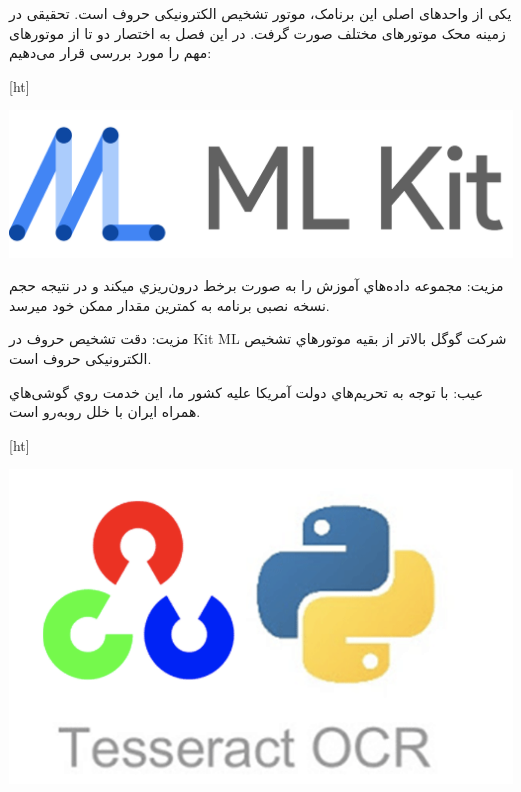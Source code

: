 


یکی از واحدهای اصلی این برنامک، موتور تشخیص الکترونیکی حروف است. تحقیقی در زمینه محک موتورهای مختلف صورت گرفت. در این فصل به اختصار دو تا از موتورهای مهم را مورد بررسی قرار می‌دهیم:




[ht]
\begin{center}
\includegraphics[scale=0.15]{front/template/images/ml-kit.png}
\end{center}


مزیت: مجموعه داده‌هاي آموزش را به صورت برخط درون‌ریزي میکند و در نتیجه
حجم نسخه نصبی برنامه به کمترین مقدار ممکن خود میرسد.

 مزیت: دقت تشخیص حروف در Kit ML شرکت گوگل بالاتر از بقیه موتورهاي
تشخیص الکترونیکی حروف است.

عیب: با توجه به تحریم‌هاي دولت آمریکا علیه کشور ما، این خدمت روي گوشی‌هاي
همراه ایران با خلل روبه‌رو است.



[ht]
\begin{center}
\includegraphics[scale=0.45]{front/template/images/tesseract.png}
\end{center}


